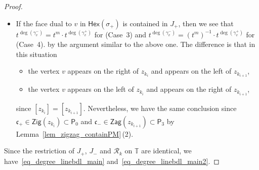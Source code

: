 \documentclass[pdftex]{sigma}
\numberwithin{equation}{section}
\theoremstyle{definition}
\newcommand{\TT}{\mathbb{T}}
\newcommand{\calR}{\mathcal{R}}
\newcommand{\fkc}{\mathfrak{c}}
\newcommand{\sfP}{\mathsf{P}}
\newcommand{\Zig}{\mathsf{Zig}}
\newcommand{\Zag}{\mathsf{Zag}}
\newcommand{\Hex}{\mathsf{Hex}}
\begin{document}
\begin{proof}
\begin{itemize}
\item If the face dual to $v$ in $\Hex(\sigma_+)$ is contained in $J_+$, then
we see that
$t^{\deg(\gamma^-_v)}=t^m\cdot t^{\deg(\gamma^+_v)}$ for (Case~3) and $t^{\deg(\gamma^-_v)}=(t^m)^{-1}\cdot t^{\deg(\gamma^+_v)}$ for (Case~4).
by the argument similar to the above one. The difference is that in this situation
\begin{itemize}\setlength{\leftskip}{1cm}\itemsep=0pt
\item[(Case 3)] the vertex $v$ appears on the right of $z_{k_i}$ and appears on the left of $z_{k_{i+1}}$,
\item[(Case 4)] the vertex $v$ appears on the left of $z_{k_i}$ and appears on the right of $z_{k_{i+1}}$,
\end{itemize}
since $[z_{k_i}]=[z_{k_{i+1}}]$.
Nevertheless, we have the same conclusion since $\fkc_+\in\Zig(z_{k_i})\subset\sfP_0$ and $\fkc_-\in\Zag(z_{k_{i+1}})\subset\sfP_3$
by Lemma~\ref{lem_zigzag_containPM}\,(2).
\end{itemize}
Since the restriction of $J_+$, $J_-$ and $\calR_k$ on $\TT$ are identical,
we have~\eqref{eq_degree_linebdl_main} and~\eqref{eq_degree_linebdl_main2}.


\end{proof}
\end{document}
